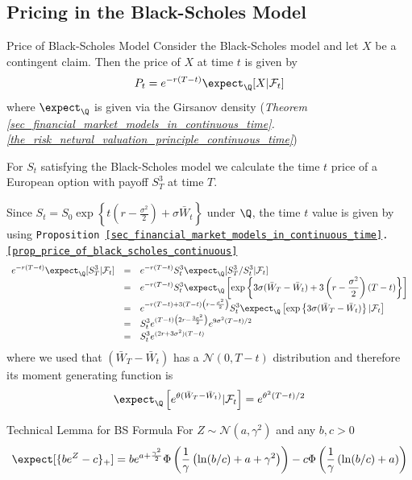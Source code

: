 \documentclass[11pt,a4paper]{article}
\begin{document}
\subsection{Pricing in the Black-Scholes Model}

  \begin{proposition}{Price of Black-Scholes Model}\label{prop_price_of_black_scholes_continuous}
    Consider the Black-Scholes model and let $X$ be a contingent claim. Then the price of $X$ at time $t$ is given by
    \[ P_t=e^{-r(T-t)}\expect_\Q[X|\mathcal{F}_t] \]
    where $\expect_\Q$ is given via the Girsanov density (\textit{Theorem \ref{sec_financial_market_models_in_continuous_time}.\ref{the_risk_netural_valuation_principle_continuous_time}})
  \end{proposition}

  \begin{example}{}
    For $S_t$ satisfying the Black-Scholes model we calculate the time $t$ price of a European option with payoff $S_T^3$ at time $T$.
    \par Since $S_t=S_0\exp\left\{t\left(r-\frac{\sigma^2}2\right)+\sigma\bar{W}_t\right\}$ under $\Q$, the time $t$ value is given by using \texttt{Proposition \ref{sec_financial_market_models_in_continuous_time}.\ref{prop_price_of_black_scholes_continuous}}
    \[\everymath={\displaystyle}\begin{array}{rcl}
      e^{-r(T-t)}\expect_\Q[S_T^3|\mathcal{F}_t]&=&e^{-r(T-t)}S_t^3\expect_\Q[S_T^3/S_t^3|\mathcal{F}_t]\\
      &=&e^{-r(T-t)}S_t^3\expect_\Q\left[\exp\left\{3\sigma(\bar{W}_T-\bar{W}_t)+3\left(r-\frac{\sigma^2}2\right)(T-t)\right\}\right]\\
      &=&e^{-r(T-t)+3(T-t)\left(r-\frac{\sigma^2}2\right)}S_t^3\expect_\Q\left[\exp\left\{3\sigma(\bar{W}_T-\bar{W}_t)\right\}|\mathcal{F}_t\right]\\
      &=&S_t^3e^{(T-t)\left(2r-\frac{3\sigma^2}2\right)}e^{9\sigma^2(T-t)/2}\\
      &=&S_t^3e^{(2r+3\sigma^2)(T-t)}
    \end{array}\]
    where we used that $(\bar{W}_T-\bar{W}_t)$ has a $\mathcal{N}(0,T-t)$ distribution and therefore its moment generating function is
    \[ \expect_\Q\left[e^{\theta(\bar{W}_T-\bar{W}_t)}|\mathcal{F}_t\right]=e^{\theta^2(T-t)/2} \]
  \end{example}

  \begin{theorem}{Technical Lemma for BS Formula}\label{the_technical_lemma_for_BS}
    For $Z\sim\mathcal{N}(a,\gamma^2)$ and any $b,c>0$
    \[ \expect[\{be^Z-c\}_+]=be^{a+\frac{\gamma^2}2}\Phi\left(\frac1\gamma\left(\ln(b/c)+a+\gamma^2\right)\right)-c\Phi\left(\frac1\gamma\left(\ln(b/c)+a\right)\right) \]
  \end{theorem}
\end{document}
